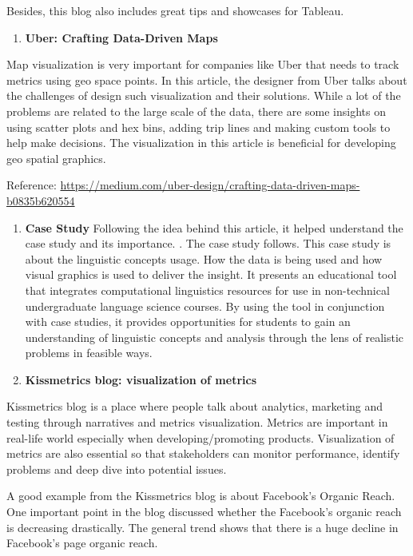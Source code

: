 \documentclass[]{book}
\providecommand{\tightlist}{%
  \setlength{\itemsep}{0pt}\setlength{\parskip}{0pt}}
\theoremstyle{definition}
\theoremstyle{definition}
\theoremstyle{definition}
\theoremstyle{remark}
\begin{document}
Besides, this blog also includes great tips and showcases for Tableau.

\begin{enumerate}
\def\labelenumi{\arabic{enumi}.}
\setcounter{enumi}{12}
\tightlist
\item
  \textbf{Uber: Crafting Data-Driven Maps}
\end{enumerate}

Map visualization is very important for companies like Uber that needs
to track metrics using geo space points. In this article, the designer
from Uber talks about the challenges of design such visualization and
their solutions. While a lot of the problems are related to the large
scale of the data, there are some insights on using scatter plots and
hex bins, adding trip lines and making custom tools to help make
decisions. The visualization in this article is beneficial for
developing geo spatial graphics.

Reference:
\url{https://medium.com/uber-design/crafting-data-driven-maps-b0835b620554}

\begin{enumerate}
\def\labelenumi{\arabic{enumi}.}
\setcounter{enumi}{13}
\item
  \textbf{Case Study} Following the idea behind this article, it helped
  understand the case study and its importance. \citep{article_case}.
  The case study follows. This case study is about the linguistic
  concepts usage. How the data is being used and how visual graphics is
  used to deliver the insight. It presents an educational tool that
  integrates computational linguistics resources for use in
  non-technical undergraduate language science courses. By using the
  tool in conjunction with case studies, it provides opportunities for
  students to gain an understanding of linguistic concepts and analysis
  through the lens of realistic problems in feasible ways.
  \citep{lingui_data}
\item
  \textbf{Kissmetrics blog: visualization of metrics}
\end{enumerate}

Kissmetrics blog is a place where people talk about analytics, marketing
and testing through narratives and metrics visualization. Metrics are
important in real-life world especially when developing/promoting
products. Visualization of metrics are also essential so that
stakeholders can monitor performance, identify problems and deep dive
into potential issues.

A good example from the Kissmetrics blog is about Facebook's Organic
Reach. One important point in the blog discussed whether the Facebook's
organic reach is decreasing drastically. The general trend shows that
there is a huge decline in Facebook's page organic reach.
\end{document}
